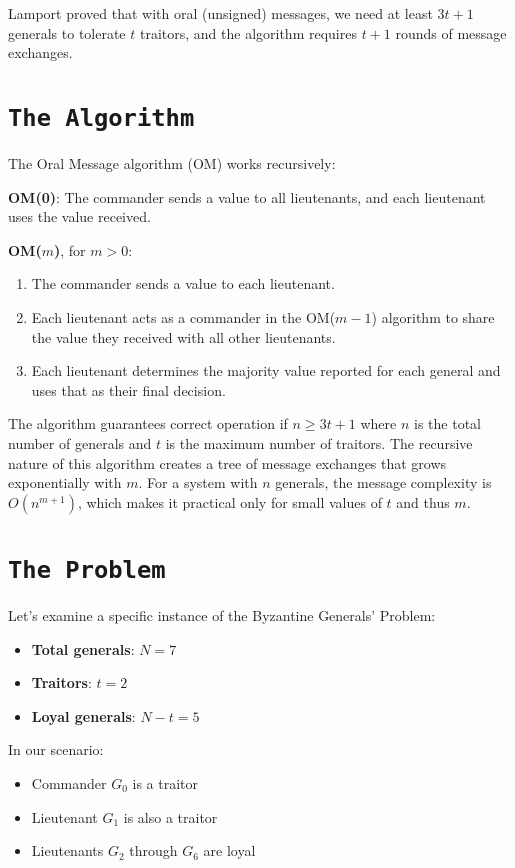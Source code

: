 \documentclass[11pt]{article}
\begin{document}
Lamport proved that with oral (unsigned) messages, we need at least $3t+1$ generals to tolerate $t$ traitors, and the algorithm requires $t+1$ rounds of message exchanges.

\section*{\texttt{\Large The Algorithm}}
\justifying
The Oral Message algorithm (OM) works recursively:

\textbf{OM(0)}: The commander sends a value to all lieutenants, and each lieutenant uses the value received.

\textbf{OM($m$)}, for $m > 0$:
\begin{enumerate}
    \item The commander sends a value to each lieutenant.
    \item Each lieutenant acts as a commander in the OM($m-1$) algorithm to share the value they received with all other lieutenants.
    \item Each lieutenant determines the majority value reported for each general and uses that as their final decision.
\end{enumerate}

The algorithm guarantees correct operation if $n \geq 3t+1$ where $n$ is the total number of generals and $t$ is the maximum number of traitors.
The recursive nature of this algorithm creates a tree of message exchanges that grows exponentially with $m$. For a system with $n$ generals, the message complexity is $O(n^{m+1})$, which makes it practical only for small values of $t$ and thus $m$.

\section*{\texttt{\Large The Problem}}
\justifying
Let's examine a specific instance of the Byzantine Generals' Problem:

\begin{itemize}
    \item \textbf{Total generals}: $N = 7$
    \item \textbf{Traitors}: $t = 2$
    \item \textbf{Loyal generals}: $N - t = 5$
\end{itemize}

In our scenario:
\begin{itemize}
    \item Commander $G_0$ is a traitor
    \item Lieutenant $G_1$ is also a traitor
    \item Lieutenants $G_2$ through $G_6$ are loyal
\end{itemize}
\end{document}
